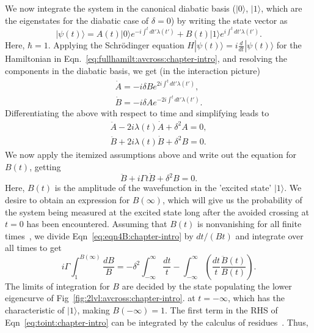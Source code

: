 We now integrate the system in the canonical diabatic basis ($|0\rangle$, $|1\rangle$, which are the eigenstates for the diabatic case of $\delta=0$) by writing the state vector as
\begin{equation}
|\psi(t)\rangle = A(t) |0\rangle e^{-i\int^t dt' \lambda(t')} + B(t) |1\rangle e^{i\int^t dt' \lambda(t')}.
\end{equation}
Here, $\hbar=1$. Applying the Schr\"odinger equation $H|\psi(t)\rangle=i\frac{d}{dt}|\psi(t)\rangle$ for the Hamiltonian in Eqn.~\ref{eq:fullhamilt:avcross:chapter-intro}, and resolving the components in the diabatic basis, we get (in the interaction picture)
\begin{eqnarray}
\dot{A} = -i \delta B e^{2i\int^t dt' \lambda(t')}, \nonumber \\
\dot{B} = -i \delta A e^{-2i\int^t dt' \lambda(t')}.
\end{eqnarray}
Differentiating the above with respect to time and simplifying leads to
\begin{eqnarray}
\ddot{A} -2i\lambda(t) \dot{A} + \delta^2 A=0, \nonumber \\
\ddot{B} +2i\lambda(t) \dot{B} + \delta^2 B=0.
\end{eqnarray}
We now apply the itemized assumptions above and write out the equation for $B(t)$, getting
\begin{equation}
\ddot{B} + i\Gamma t \dot{B} + \delta^2 B=0.
\label{eq:eqn4B:chapter-intro}
\end{equation}
Here, $B(t)$ is the amplitude of the wavefunction in the 'excited state' $|1\rangle$. We desire to obtain an expression for $B(\infty)$, which will give us the probability of the system being measured at the excited state long after the avoided crossing at $t=0$ has been encountered. Assuming that $B(t)$ is nonvanishing for all finite times~\cite{wittig:lzformula}, we divide Eqn~\ref{eq:eqn4B:chapter-intro} by $dt/(Bt)$ and integrate over all times to get
\begin{equation}
i\Gamma \int^{B(\infty)}_1 \frac{dB}{B} = - \delta^2 \int^\infty_{-\infty} \frac{dt}{t} - \int^\infty_{-\infty} \left( \frac{dt}{t} \frac{\ddot{B}(t)}{B(t)}\right).
\label{eq:toint:chapter-intro}
\end{equation}
The limits of integration for $B$ are decided by the state populating the lower eigencurve of Fig~\ref{fig:2lvl:avcross:chapter-intro}. at $t=-\infty$, which has the characteristic of $|1\rangle$, making $B(-\infty)=1$. The first term in the RHS of Eqn~\ref{eq:toint:chapter-intro} can be integrated by the calculus of residues~\cite{arfken}. Thus,
